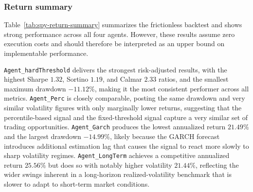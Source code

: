﻿\documentclass{article}
\begin{document}
\subsubsection{Return summary}
\begin{table}[H]
\centering
\footnotesize
\caption{SPY performance summary under updated parameter settings.}
\label{tab:spy-return-summary}
\end{table}
Table~\ref{tab:spy-return-summary} summarizes the frictionless backtest and shows strong performance across all four agents. However, these results assume zero execution costs and should therefore be interpreted as an upper bound on implementable performance.

\texttt{Agent\_hardThreshold} delivers the strongest risk-adjusted results, with the highest Sharpe \(1.32\), Sortino \(1.19\), and Calmar \(2.33\) ratios, and the smallest maximum drawdown \(-11.12\%\), making it the most consistent performer across all metrics. \texttt{Agent\_Perc} is closely comparable, posting the same drawdown and very similar volatility figures with only marginally lower returns, suggesting that the percentile-based signal and the fixed-threshold signal capture a very similar set of trading opportunities. \texttt{Agent\_Garch} produces the lowest annualized return \(21.49\%\) and the largest drawdown \(-14.99\%\), likely because the GARCH forecast introduces additional estimation lag that causes the signal to react more slowly to sharp volatility regimes. \texttt{Agent\_LongTerm} achieves a competitive annualized return \(25.56\%\) but does so with notably higher volatility \(21.44\%\), reflecting the wider swings inherent in a long-horizon realized-volatility benchmark that is slower to adapt to short-term market conditions.
\end{document}
